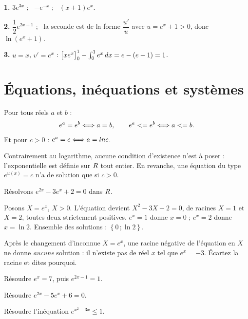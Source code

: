 \begin{corrige}
\textbf{1.} $3e^{3x}$ ; \ $-e^{-x}$ ; \ $(x+1)e^{x}$.

\textbf{2.} $\dfrac{1}{2}e^{2x+1}$ ; \ la seconde est de la forme
$\dfrac{u'}{u}$ avec $u = e^{x}+1>0$, donc $\ln\left(e^{x}+1\right)$.

\textbf{3.} $u=x$, $v'=e^{x}$ :
$\bigl[xe^{x}\bigr]_{0}^{1} - \int_{0}^{1}e^{x}\,dx = e - (e-1) = 1$.
\end{corrige}

\section{Équations, inéquations et systèmes}

\begin{propriete}
Pour tous réels $a$ et $b$ :
\[
  e^{a} = e^{b} \Longleftrightarrow a = b, \qquad e^{a} <= e^{b} \Longleftrightarrow a <= b .
\]
Et pour $c>0$ : $e^{a} = c \Longleftrightarrow a = ln c$.
\end{propriete}

\begin{remarque}
Contrairement au logarithme, aucune condition d'existence n'est à poser :
l'exponentielle est définie sur $R$ tout entier. En revanche, une équation du
type $e^{u(x)} = c$ n'a de solution que si $c>0$.
\end{remarque}

\begin{exemple}
Résolvons $e^{2x} - 3e^{x} + 2 = 0$ dans $R$.

Posons $X = e^{x}$, $X>0$. L'équation devient $X^{2}-3X+2 = 0$, de racines
$X = 1$ et $X = 2$, toutes deux strictement positives.
$e^{x} = 1$ donne $x = 0$ ; $e^{x} = 2$ donne $x = \ln 2$. Ensemble des
solutions : $\left\{0\,;\ln 2\right\}$.
\end{exemple}

\begin{erreurclassique}
Après le changement d'inconnue $X = e^{x}$, une racine négative de l'équation
en $X$ ne donne \emph{aucune} solution : il n'existe pas de réel $x$ tel que
$e^{x} = -3$. Écartez la racine et dites pourquoi.
\end{erreurclassique}

\begin{entrainement}
\exo[\niveau{1}] Résoudre $e^{x} = 7$, puis $e^{2x-1} = 1$.

\exo[\niveau{2}] Résoudre $e^{2x} - 5e^{x} + 6 = 0$.

\exo[\niveau{2}] Résoudre l'inéquation $e^{x^{2}-3x} \leq 1$.
\end{entrainement}

